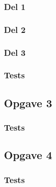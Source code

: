 \subsubsection{Del 1}
\label{O2_1}

\subsubsection{Del 2}
\label{O2_2}

\subsubsection{Del 3}
\label{O2_3}

\subsubsection{Tests}
\label{O2_Tests}


\subsection{Opgave 3}
\label{O3}

\subsubsection{Tests}
\label{O3_Tests}

\subsection{Opgave 4}
\label{O4}


\subsubsection{Tests}
\label{O4_Tests}